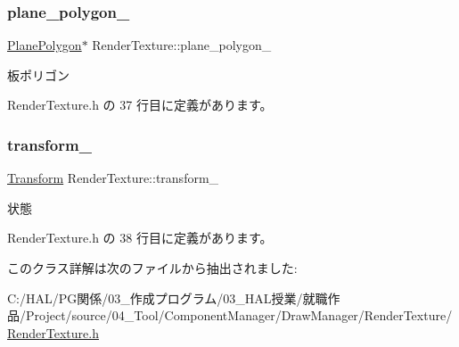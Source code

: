 \subsubsection{\texorpdfstring{plane\+\_\+polygon\+\_\+}{plane\_polygon\_}}
{\footnotesize\ttfamily \mbox{\hyperlink{class_plane_polygon}{Plane\+Polygon}}$\ast$ Render\+Texture\+::plane\+\_\+polygon\+\_\+\hspace{0.3cm}{\ttfamily [private]}}



板ポリゴン 



 Render\+Texture.\+h の 37 行目に定義があります。

\mbox{\label{class_render_texture_a390e49a5efe8a6a977e8ba287ec969a2}} 
\subsubsection{\texorpdfstring{transform\+\_\+}{transform\_}}
{\footnotesize\ttfamily \mbox{\hyperlink{class_transform}{Transform}} Render\+Texture\+::transform\+\_\+\hspace{0.3cm}{\ttfamily [private]}}



状態 



 Render\+Texture.\+h の 38 行目に定義があります。



このクラス詳解は次のファイルから抽出されました\+:\begin{DoxyCompactItemize}
\item 
C\+:/\+H\+A\+L/\+P\+G関係/03\+\_\+作成プログラム/03\+\_\+\+H\+A\+L授業/就職作品/\+Project/source/04\+\_\+\+Tool/\+Component\+Manager/\+Draw\+Manager/\+Render\+Texture/\mbox{\hyperlink{_render_texture_8h}{Render\+Texture.\+h}}\end{DoxyCompactItemize}
